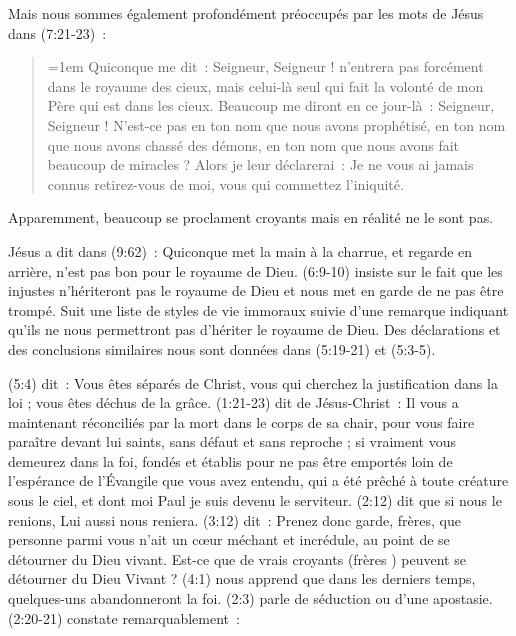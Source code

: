 Mais nous sommes également profondément préoccupés par les mots de Jésus dans (7:21-23)~:

\begin{quote}
\begin{digestpar}{}
\begin{pocketpar}{\emergencystretch=1em}
 \Og Quiconque me dit~: Seigneur,
 Seigneur ! n'entrera pas forcément
 dans le royaume des cieux, mais celui-là seul qui fait la volonté de mon Père
 qui est dans les cieux. Beaucoup me diront en ce jour-là~: Seigneur, Seigneur !
 N'est-ce pas en ton nom que nous avons prophétisé, en ton nom que nous avons
 chassé des démons, en ton nom que nous avons fait beaucoup de miracles ?
 Alors je leur déclarerai~: Je ne vous ai jamais connus retirez-vous de moi,
 vous qui commettez l'iniquité. \Fg{}
\end{pocketpar}
\end{digestpar}
\end{quote}

\begin{pocketpar}{}
Apparemment, beaucoup se pro\-cla\-ment croyants mais en réalité ne le sont pas.
\end{pocketpar}

Jésus a dit dans (9:62)~: \Og Quiconque met la main à la charrue,
 et regarde en arrière, n'est pas bon pour le royaume de Dieu. \Fg{}
 (6:9-10) insiste sur le fait que
 \Og les injustes n'hériteront pas le royaume de Dieu \Fg{}
 et nous met en garde de ne pas être trompé.
 Suit une liste de styles de vie immoraux suivie d'une remarque
 indiquant qu'ils ne nous permettront pas d'hériter le royaume de Dieu.
 Des déclarations et des conclusions similaires nous sont données
 dans (5:19-21) et (5:3-5).

(5:4) dit~:
 \Og Vous êtes séparés de Christ, vous qui cherchez la justification
 dans la loi ; vous êtes déchus de la grâce. \Fg{}
 (1:21-23) dit de Jésus-Christ~:
 \Og Il vous a maintenant réconciliés par la mort dans le corps de sa chair,
 pour vous faire paraître devant lui saints, sans défaut et sans reproche ;
 si vraiment vous demeurez dans la foi, fondés et établis pour ne pas être
 emportés loin de l'espérance de l'Évangile que vous avez entendu,
 qui a été prêché à toute créature sous le ciel, et dont moi Paul
 je suis devenu le serviteur. \Fg{}
 (2:12) dit que \Og si nous le renions, Lui aussi nous reniera. \Fg{}
 (3:12) dit~:
 \Og Prenez donc garde, frères, que personne parmi vous n'ait un cœur méchant
 et incrédule, au point de se détourner du Dieu vivant. \Fg{}
 Est-ce que de vrais croyants (\Og frères \Fg{}) peuvent se détourner du Dieu Vivant ?
 (4:1) nous apprend que \Og dans les derniers temps,
 quelques-uns abandonneront la foi. \Fg{}
 (2:3) parle de \Og séduction \Fg{} ou d'une apostasie.
 (2:20-21) constate remarquablement~:

